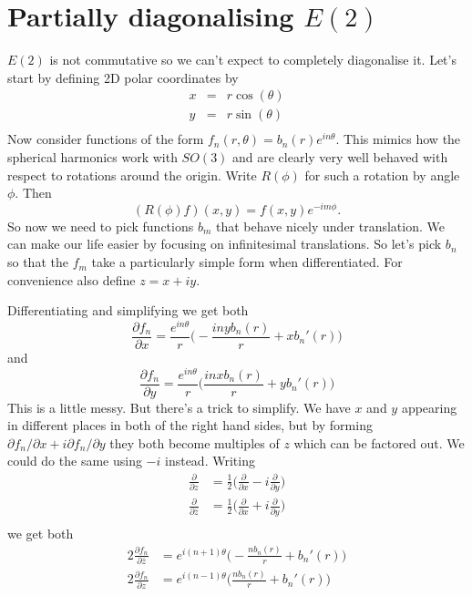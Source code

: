 \documentclass{article}
\begin{document}
\section{Partially diagonalising $E(2)$}
$E(2)$ is not commutative so we can't expect to completely diagonalise it.
Let's start by defining 2D polar coordinates by
\begin{align*}
x & = & r\cos(\theta) \\
y & = & r\sin(\theta) \\
\end{align*}
Now consider functions of the form $f_n(r,\theta)=b_n(r)e^{in\theta}$.
This mimics how the spherical harmonics work with $SO(3)$ and are clearly very well behaved with respect to rotations around the origin.
Write $R(\phi)$ for such a rotation by angle $\phi$.
Then 
\[
(R(\phi)f)(x,y) = f(x,y)e^{-im\phi}.
\]
So now we need to pick functions $b_m$ that behave nicely under translation.
We can make our life easier by focusing on infinitesimal translations.
So let's pick $b_n$ so that the $f_m$ take a particularly simple form when differentiated.
For convenience also define $z=x+iy$.

Differentiating and simplifying we get both
\[
\frac{\partial f_n}{\partial x} = 
    \frac{e^{in\theta}}{r}\Big(-\frac{inyb_n(r)}{r}+xb_n'(r)\Big)
\]
and
\[
\frac{\partial f_n}{\partial y} = 
    \frac{e^{in\theta}}{r}\Big(\frac{inxb_n(r)}{r}+yb_n'(r)\Big)
\]
This is a little messy.
But there's a trick to simplify.
We have $x$ and $y$ appearing in different places in both of the right hand sides, but by forming $\partial f_n/\partial x+i\partial f_n/\partial y$ they both become multiples of $z$ which can be factored out.
We could do the same using $-i$ instead.
Writing
\begin{align*}
\frac{\partial}{\partial z} &= \frac{1}{2}\Big(\frac{\partial}{\partial x}-i\frac{\partial}{\partial y}\Big)\\
\frac{\partial}{\partial\bar{z}} &= \frac{1}{2}\Big(\frac{\partial}{\partial x}+i\frac{\partial}{\partial y}\Big)\\
\end{align*}
we get both
\begin{align*}
2\frac{\partial f_n}{\partial\bar{z}} & = e^{i(n+1)\theta}
    \Big(-\frac{nb_n(r)}{r}+b_n'(r)\Big)\\
2\frac{\partial f_n}{\partial z} & = e^{i(n-1)\theta}
    \Big(\frac{nb_n(r)}{r}+b_n'(r)\Big)
\end{align*}
\end{document}
